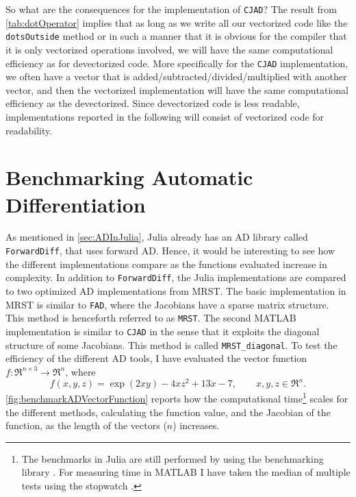 So what are the consequences for the implementation of \texttt{CJAD}? The result from \autoref{tab:dotOperator} implies that as long as we write all our vectorized code like the \texttt{dotsOutside} method or in such a manner that it is obvious for the compiler that it is only vectorized operations involved, we will have the same computational efficiency as for devectorized code. More specifically for the \texttt{CJAD} implementation, we often have a vector that is added/subtracted/divided/multiplied with another vector, and then the vectorized implementation will have the same computational efficiency as the devectorized. Since devectorized code is less readable,  implementations reported in the following will consist of vectorized code for readability.

\section{Benchmarking Automatic Differentiation}
As mentioned in \autoref{sec:ADInJulia}, Julia already has an AD library called \texttt{ForwardDiff}, that uses forward AD. Hence, it would be interesting to see how the different implementations compare as the functions evaluated increase in complexity. In addition to \texttt{ForwardDiff}, the Julia implementations are compared to two optimized AD implementations from MRST. The basic implementation in MRST is similar to \texttt{FAD}, where the Jacobians have a sparse matrix structure. This method is henceforth referred to as \texttt{MRST}. The second MATLAB implementation is similar to \texttt{CJAD} in the sense that it exploits the diagonal structure of some Jacobians. This method is called \texttt{MRST\_diagonal}. To test the efficiency of the different AD tools, I have evaluated the vector function $f: \Re^{n\times 3} \rightarrow \Re^n $, where
\begin{equation}
\label{eq:benchmarkFunction}
f(x,y,z)  = \exp(2xy) - 4xz^2 + 13x - 7, \qquad x,y,z \in \Re^n.
\end{equation}
\autoref{fig:benchmarkADVectorFunction} reports how the computational time\footnote{The benchmarks in Julia are still performed by using the benchmarking library \emph{\cite{BenchmarkTools}}. For measuring time in MATLAB I have taken the median of multiple tests using the stopwatch \emph{\cite{TicToc}}.} scales for the different methods, calculating the function value, and the Jacobian of the function, as the length of the vectors ($n$) increases.

